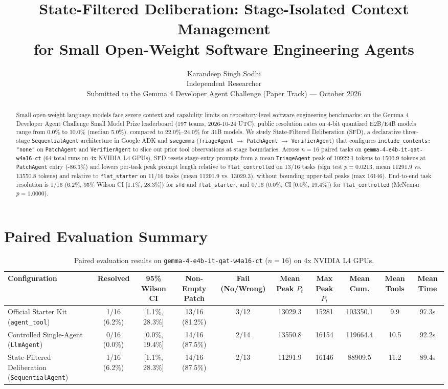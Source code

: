 \documentclass[10pt,twocolumn]{article}
\title{State-Filtered Deliberation: Stage-Isolated Context Management\\for Small Open-Weight Software Engineering Agents}
\author{Karandeep Singh Sodhi\\Independent Researcher\\\small Submitted to the Gemma 4 Developer Agent Challenge (Paper Track) --- October 2026}
\date{}
\begin{document}
\maketitle

\begin{abstract}
Small open-weight language models face severe context and capability limits on repository-level software engineering benchmarks: on the Gemma 4 Developer Agent Challenge Small Model Prize leaderboard (197 teams, 2026-10-24 UTC), public resolution rates on 4-bit quantized E2B/E4B models range from 0.0\% to 10.0\% (median 5.0\%), compared to 22.0\%--24.0\% for 31B models. We study State-Filtered Deliberation (SFD), a declarative three-stage \texttt{SequentialAgent} architecture in Google ADK and \texttt{swegemma} (\texttt{TriageAgent} $\to$ \texttt{PatchAgent} $\to$ \texttt{VerifierAgent}) that configures \texttt{include\_contents: "none"} on \texttt{PatchAgent} and \texttt{VerifierAgent} to slice out prior tool observations at stage boundaries. Across $n = 16$ paired tasks on \texttt{gemma-4-e4b-it-qat-w4a16-ct} (64 total runs on 4x NVIDIA L4 GPUs), SFD resets stage-entry prompts from a mean \texttt{TriageAgent} peak of 10922.1 tokens to 1500.9 tokens at \texttt{PatchAgent} entry (-86.3\%) and lowers per-task peak prompt length relative to \texttt{flat\_controlled} on 13/16 tasks (sign test $p = 0.0213$, mean 11291.9 vs. 13550.8 tokens) and relative to \texttt{flat\_starter} on 11/16 tasks (mean 11291.9 vs. 13029.3), without bounding upper-tail peaks (max 16146). End-to-end task resolution is 1/16 (6.2\%, 95\% Wilson CI [1.1\%, 28.3\%]) for \texttt{sfd} and \texttt{flat\_starter}, and 0/16 (0.0\%, CI [0.0\%, 19.4\%]) for \texttt{flat\_controlled} (McNemar $p = 1.0000$).
\end{abstract}

\section{Paired Evaluation Summary}
\begin{table}[t]
\centering
\small
\begin{tabular}{lccccccccc}
\toprule
Configuration & Resolved & 95\% Wilson CI & Non-Empty Patch & Fail (No/Wrong) & Mean Peak $P_t$ & Max Peak $P_t$ & Mean Cum. & Mean Tools & Mean Time \\
\midrule
Official Starter Kit (\texttt{agent\_tool}) & 1/16 (6.2\%) & [1.1\%, 28.3\%] & 13/16 (81.2\%) & 3/12 & 13029.3 & 15281 & 103350.1 & 9.9 & 97.3s \\
Controlled Single-Agent (\texttt{LlmAgent}) & 0/16 (0.0\%) & [0.0\%, 19.4\%] & 14/16 (87.5\%) & 2/14 & 13550.8 & 16154 & 119664.4 & 10.5 & 92.2s \\
State-Filtered Deliberation (\texttt{SequentialAgent}) & 1/16 (6.2\%) & [1.1\%, 28.3\%] & 14/16 (87.5\%) & 2/13 & 11291.9 & 16146 & 88909.5 & 11.2 & 89.4s \\
\bottomrule
\end{tabular}
\caption{Paired evaluation results on \texttt{gemma-4-e4b-it-qat-w4a16-ct} ($n = 16$) on 4x NVIDIA L4 GPUs.}
\end{table}



\end{document}
